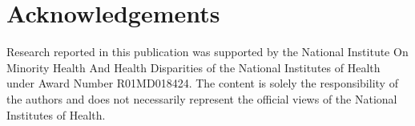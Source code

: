 \section{Acknowledgements}
Research reported in this publication was supported by the National Institute On Minority Health And Health Disparities of the National Institutes of Health under Award Number R01MD018424. The content is solely the responsibility of the authors and does not necessarily represent the official views of the National Institutes of Health.
